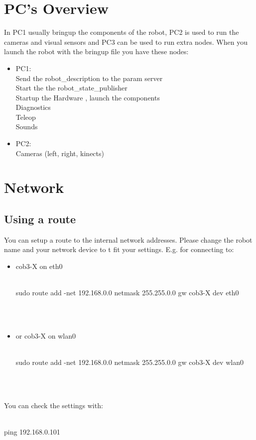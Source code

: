 \section{PC's Overview}
In PC1 usually bringup the components of the robot, PC2 is used to run the cameras and visual sensors and PC3 can be used to run extra nodes.
When you launch the robot with the bringup file you have these nodes:
\begin{itemize}
\item PC1:
\\ Send the robot\_description to the param server
\\ Start the the robot\_state\_publisher
\\Startup the Hardware , launch the components
\\ Diagnostics
\\ Teleop
\\ Sounds
 \item PC2:
\\ Cameras (left, right, kinects)
\end{itemize}
\section{Network} 
\subsection{Using a route}
You can setup a route to the internal network addresses. Please change the robot name and your network device to t fit your settings. E.g. for connecting to:
\begin{itemize}
\item cob3-X on eth0
\\
\\   \colorbox{light-gray}{
         \begin{minipage}{1.0\textwidth} 
		sudo route add -net 192.168.0.0 netmask 255.255.0.0 gw cob3-X dev eth0
         \end{minipage}  } \\
	\\

\item or cob3-X on wlan0
\\
\\   \colorbox{light-gray}{
         \begin{minipage}{1.0\textwidth} 
		sudo route add -net 192.168.0.0 netmask 255.255.0.0 gw cob3-X dev wlan0
         \end{minipage}  } \\
	\\

\end{itemize}
You can check the settings with: \\
\\   \colorbox{light-gray}{
         \begin{minipage}{1.0\textwidth} 
		ping 192.168.0.101
         \end{minipage}  } \\
	\\

